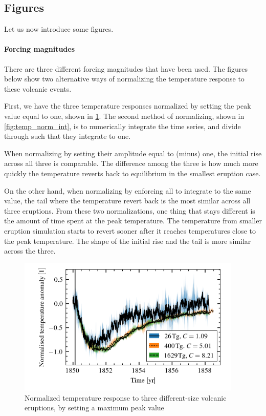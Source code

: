 \documentclass{ametsocV5}
\begin{document}
\subsection{Figures}

Let us now introduce some figures.

\paragraph*{Forcing magnitudes}

There are three different forcing magnitudes that have been used. The figures below show
two alternative ways of normalizing the temperature response to these volcanic events.

First, we have the three temperature responses normalized by setting the peak value
equal to one, shown in \cref{fig:temp_norm_max}. The second method of normalizing, shown
in \cref{fig:temp_norm_int}, is to numerically integrate the time series, and divide
through such that they integrate to one.

When normalizing by setting their amplitude equal to (minus) one, the initial rise
across all three is comparable. The difference among the three is how much more quickly
the temperature reverts back to equilibrium in the smallest eruption case.

On the other hand, when normalizing by enforcing all to integrate to the same value, the
tail where the temperature revert back is the most similar across all three eruptions.
From these two normalizations, one thing that stays different is the amount of time
spent at the peak temperature. The temperature from smaller eruption simulation starts
to revert sooner after it reaches temperatures close to the peak temperature. The shape
of the initial rise and the tail is more similar across the three.

\begin{figure}
  \begin{center}
    \includegraphics[width=0.95\textwidth]{figures/compare-waveform-max.png}
  \end{center}
  \caption{Normalized temperature response to three different-size volcanic eruptions,
    by setting a maximum peak value}
  \label{fig:temp_norm_max}
\end{figure}
\end{document}
